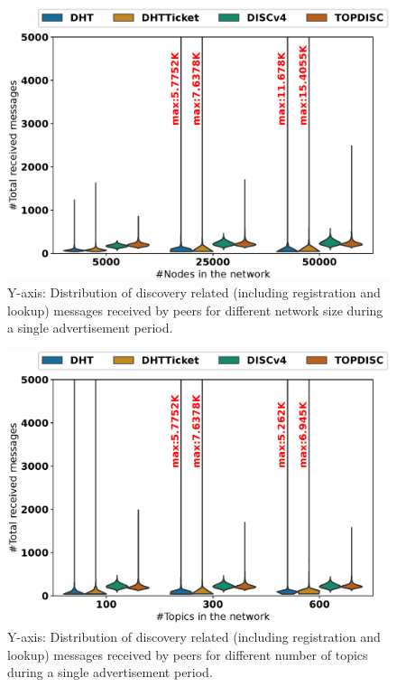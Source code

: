 
\begin{figure}[!h]
\centering
\includegraphics[width=\linewidth]{results/efficiency/violin_size_totalMsg.eps}
\caption{Y-axis: Distribution of discovery related (including registration and lookup) messages received by peers for different network size during a single advertisement period.}
\label{fig:msgsPerSize}
\end{figure}

\begin{figure}
\centering
\includegraphics[width=\linewidth]{results/efficiency/violin_topic_totalMsg.eps}
\caption{Y-axis: Distribution of discovery related (including registration and lookup) messages received by peers for different number of topics during a single advertisement period.}
\label{fig:msgsPerTopic}
\end{figure}

